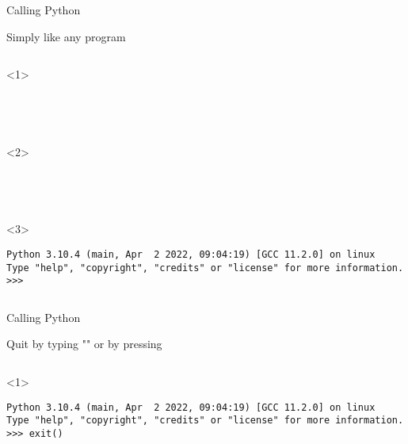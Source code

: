 \begin{frame}[fragile]{Calling Python}

   Simply like any program

  \begin{columns}[onlytextwidth]
    \begin{column}{\textwidth}
      \begin{onlyenv}<1>
        \begin{lstlisting}[style=sh]
%*\LSTPrompt*)




 \end{lstlisting}
      \end{onlyenv}

      \begin{onlyenv}<2>
        \begin{lstlisting}[style=sh]
%*\LSTPrompt*) python3




 \end{lstlisting}
      \end{onlyenv}

      \begin{onlyenv}<3>
        \begin{lstlisting}[style=sh]
%*\LSTPrompt*) python3
Python 3.10.4 (main, Apr  2 2022, 09:04:19) [GCC 11.2.0] on linux
Type "help", "copyright", "credits" or "license" for more information.
>>> \end{lstlisting}
      \end{onlyenv}
    \end{column}
  \end{columns}
\end{frame}



\begin{frame}[fragile]{Calling Python}

   Quit by typing "" or by pressing 

  \begin{columns}[onlytextwidth]
    \begin{column}{\textwidth}
      \begin{onlyenv}<1>
        \begin{lstlisting}[style=sh]
%*\LSTPrompt*) python3
Python 3.10.4 (main, Apr  2 2022, 09:04:19) [GCC 11.2.0] on linux
Type "help", "copyright", "credits" or "license" for more information.
>>> exit() \end{lstlisting}
      \end{onlyenv}
    \end{column}
  \end{columns}
\end{frame}



